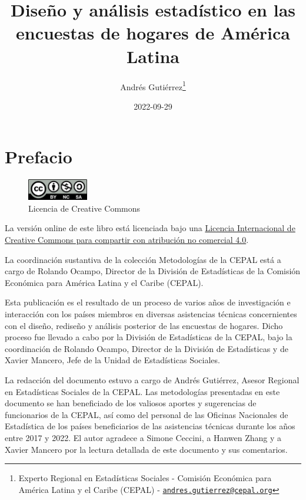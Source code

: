 \documentclass[
  12pt,
]{book}
\title{Diseño y análisis estadístico en las encuestas de hogares de América Latina}
\author{Andrés Gutiérrez\footnote{Experto Regional en Estadísticas Sociales - Comisión Económica para América Latina y el Caribe (CEPAL) - \href{mailto:andres.gutierrez@cepal.org}{\nolinkurl{andres.gutierrez@cepal.org}}}}
\date{2022-09-29}
\begin{document}
\maketitle

{
\hypersetup{linkcolor=}
\setcounter{tocdepth}{1}
\tableofcontents
}
\listoffigures
\listoftables
\hypertarget{prefacio}{%
\chapter*{Prefacio}\label{prefacio}}

\begin{figure}
\includegraphics[width=100px]{Pics/CClicence} \caption{Licencia de Creative Commons}\label{fig:unnamed-chunk-1}
\end{figure}

La versión online de este libro está licenciada bajo una \href{http://creativecommons.org/licenses/by-nc-sa/4.0/}{Licencia Internacional de Creative Commons para compartir con atribución no comercial 4.0}.

La coordinación sustantiva de la colección Metodologías de la CEPAL está a cargo de Rolando Ocampo, Director de la División de Estadísticas de la Comisión Económica para América Latina y el Caribe (CEPAL).

Esta publicación es el resultado de un proceso de varios años de investigación e interacción con los países miembros en diversas asistencias técnicas concernientes con el diseño, rediseño y análisis posterior de las encuestas de hogares. Dicho proceso fue llevado a cabo por la División de Estadísticas de la CEPAL, bajo la coordinación de Rolando Ocampo, Director de la División de Estadísticas y de Xavier Mancero, Jefe de la Unidad de Estadísticas Sociales.

La redacción del documento estuvo a cargo de Andrés Gutiérrez, Asesor Regional en Estadísticas Sociales de la CEPAL. Las metodologías presentadas en este documento se han beneficiado de los valiosos aportes y sugerencias de funcionarios de la CEPAL, así como del personal de las Oficinas Nacionales de Estadística de los países beneficiarios de las asistencias técnicas durante los años entre 2017 y 2022. El autor agradece a Simone Ceccini, a Hanwen Zhang y a Xavier Mancero por la lectura detallada de este documento y sus comentarios.
\end{document}
